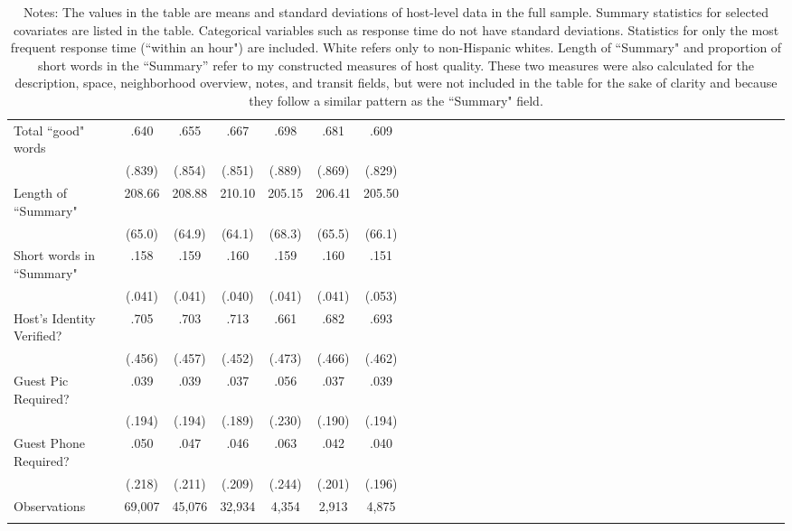 {\begin{longtable}{l*{6}{c|c|cccc}}
		Total ``good" words       & .640   &      .655&      .667 &      .698         &      .681    &	.609     \\
		& (.839) &     (.854)         &     (.851)         &     (.889)         &     (.869)         &		(.829)\\

		Length of ``Summary"      &   208.66  &      208.88 	&      210.10	&       205.15         &      206.41    &	205.50     \\
		&(65.0) &       (64.9)  &    (64.1)         &     (68.3)         &     (65.5)         &     (66.1) \\

		Short words in ``Summary"          & .158 &      .159		&      .160		&       .159         &      .160    &	.151     \\
		&(.041) &     (.041)         &     (.040)         &     (.041)         &     (.041)         &		(.053)\\                    

		Host's Identity Verified?          & .705 &      .703		&      .713		&       .661         &      .682    &	.693     \\
		&(.456) &     (.457)         &     (.452)         &     (.473)         &     (.466)         &		(.462)\\                    

		Guest Pic Required?   &   .039  &      .039		&      .037 &      .056  &      .037  	& 	.039\\
		&  (.194)  & (.194)     &     (.189)         &     (.230)         &     (.190)         &     (.194)         \\
		Guest Phone Required?   &   .050  &      .047		&      .046 &      .063 &      .042  	& 	.040\\
		&  (.218)  & (.211)     &     (.209)         &     (.244)         &     (.201)         &     (.196)         \\
		
		
		\hline
		Observations  & 69,007  & 45,076   &       32,934     &     4,354      &       2,913   &   4,875      \\
		\hline\hline
		\caption*{Notes: The values in the table are means and standard deviations of host-level data in the full sample. Summary statistics for selected covariates are listed in the table. Categorical variables such as response time do not have standard deviations. Statistics for only the most frequent response time (``within an hour") are included. White refers only to non-Hispanic whites. Length of ``Summary" and proportion of short words in the ``Summary'' refer to my constructed measures of host quality. These two measures were also calculated for the description, space, neighborhood overview, notes, and transit fields, but were not included in the table for the sake of clarity and because they follow a similar pattern as the ``Summary" field.}
		
	\end{longtable}
}
